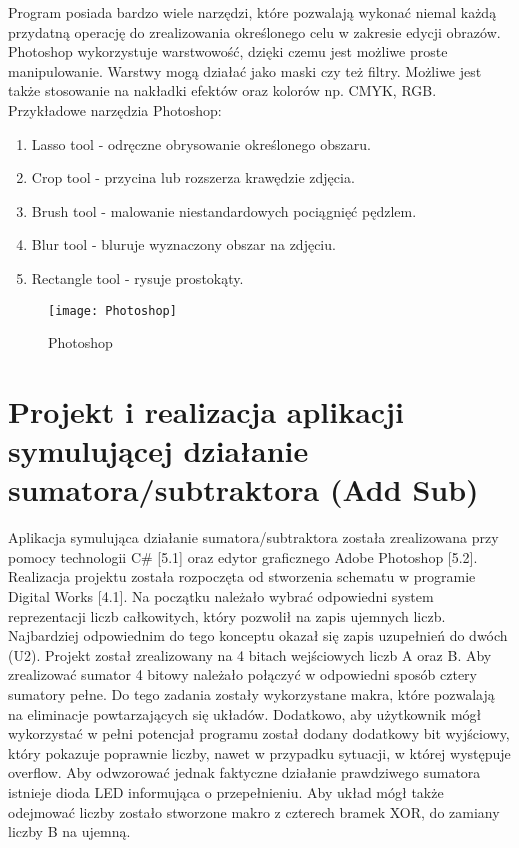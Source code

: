\documentclass[12pt, a4paper, onside, polish]{article}				%
\begin{document}
Program posiada bardzo wiele narzędzi, które pozwalają wykonać niemal każdą przydatną operację do zrealizowania określonego celu w zakresie edycji obrazów. Photoshop wykorzystuje warstwowość, dzięki czemu jest możliwe proste manipulowanie. Warstwy mogą działać jako maski czy też filtry. Możliwe jest także stosowanie na nakładki efektów oraz kolorów np. CMYK, RGB.  
\newline\newline
Przykładowe narzędzia Photoshop:
 \begin{enumerate}
\item Lasso tool - odręczne obrysowanie określonego obszaru.
\item Crop tool - przycina lub rozszerza krawędzie zdjęcia.
\item Brush tool - malowanie niestandardowych pociągnięć pędzlem.
\item Blur tool - bluruje wyznaczony obszar na zdjęciu.
\item Rectangle tool - rysuje prostokąty. \newline
 \end{enumerate}
   	\begin{figure}[H]
  	  {\centering \texttt{[image: Photoshop]} \caption{Photoshop}}\vspace{5mm}
  	 \end{figure}
  	 
\cleardoublepage







\section{Projekt i realizacja aplikacji symulującej działanie sumatora/subtraktora (Add Sub)}
\hspace{\parindent}
Aplikacja symulująca działanie sumatora/subtraktora została zrealizowana przy pomocy technologii C\# [5.1] oraz edytor graficznego Adobe Photoshop [5.2]. Realizacja projektu została rozpoczęta od stworzenia schematu w programie Digital Works [4.1]. Na początku należało wybrać odpowiedni system reprezentacji liczb całkowitych, który pozwolił na zapis ujemnych liczb. Najbardziej odpowiednim do tego konceptu okazał się zapis uzupełnień do dwóch (U2). Projekt został zrealizowany na 4 bitach wejściowych liczb A oraz B. Aby zrealizować sumator 4 bitowy należało połączyć w odpowiedni sposób cztery sumatory pełne. Do tego zadania zostały wykorzystane makra, które pozwalają na eliminacje powtarzających się układów. Dodatkowo, aby użytkownik mógł wykorzystać w pełni potencjał programu został dodany dodatkowy bit wyjściowy, który pokazuje poprawnie liczby, nawet w przypadku sytuacji, w której występuje overflow. Aby odwzorować jednak faktyczne działanie prawdziwego sumatora istnieje dioda LED informująca o przepełnieniu. Aby układ mógł także odejmować liczby zostało stworzone makro z czterech bramek XOR, do zamiany liczby B na ujemną. 
\end{document}
